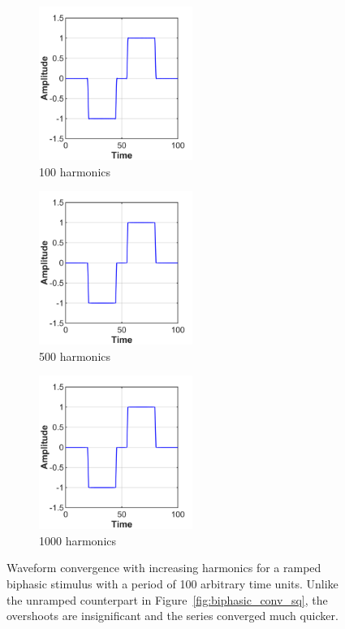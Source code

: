 \begin{figure}[p]
    \begin{subfigure}[t]{0.33\textwidth}
        \centering
        \includegraphics[width=5cm]{Simulations/TimeDep/ramped_biphasic_N100}
        \caption{100 harmonics}
        \label{fig:biphasic_conv_ramp_100}
    \end{subfigure}%
    \hfill%
    \begin{subfigure}[t]{0.33\textwidth}
        \centering
        \includegraphics[width=5cm]{Simulations/TimeDep/ramped_biphasic_N500}
        \caption{500 harmonics}
        \label{fig:biphasic_conv_ramp_500}
    \end{subfigure}%
    \hfill%
    \begin{subfigure}[t]{0.33\textwidth}
        \centering
        \includegraphics[width=5cm]{Simulations/TimeDep/ramped_biphasic_N1000}
        \caption{1000 harmonics}
        \label{fig:biphasic_conv_ramp_1000}
    \end{subfigure}
    
	\caption[Waveform convergence for a ramped biphasic stimulus]{Waveform
	convergence with increasing harmonics for a ramped biphasic stimulus with a
	period of 100 arbitrary time units. Unlike the unramped counterpart in
	Figure~\ref{fig:biphasic_conv_sq}, the overshoots are insignificant and the
	series converged much quicker.}
	\label{fig:biphasic_conv_ramp}
\end{figure}

